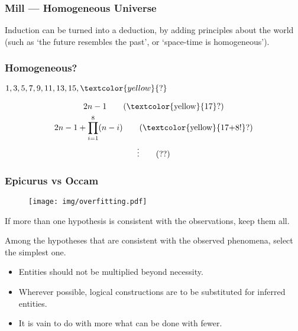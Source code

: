 \documentclass[UTF8,11pt,colorlinks,compress,openany]{beamer}%
\begin{document}
\begin{frame}\frametitle{Mill --- Homogeneous Universe}
	\begin{proposition}[Mill]
		Induction can be turned into a deduction, by adding principles about the world (such as `the future resembles the past', or `space-time is homogeneous').
	\end{proposition}
\end{frame}

\begin{frame}\frametitle{Homogeneous?}
	\begin{problem}
		$1,3,5,7,9,11,13,15,\textcolor{yellow}{\mathbf{?}}$
	\end{problem}
	\begin{solution}
		\begin{gather}
		2n-1\tag{\textcolor{yellow}{17}?}\\
		2n-1+\prod\limits_{i=1}^8(n-i)\tag{\textcolor{yellow}{17+8!}?}\\
		\vdots \tag{??}
		\end{gather}
	\end{solution}
\end{frame}

\begin{frame}\frametitle{Epicurus vs Occam}\vspace{-1ex}
	\begin{figure}[H]
		\begin{center}
			\texttt{[image: img/overfitting.pdf]}
		\end{center}
	\end{figure}\vspace{-2ex}
	\begin{proposition}[Epicurus]
		If more than one hypothesis is consistent with the observations, keep them all.
	\end{proposition}
	\begin{proposition}
		Among the hypotheses that are consistent with the observed phenomena, select the simplest one.
	\end{proposition}
	\begin{itemize}
		\item Entities should not be multiplied beyond necessity.
		\item Wherever possible, logical constructions are to be substituted for inferred entities.
		\item It is vain to do with more what can be done with fewer.
	\end{itemize}
\end{frame}
\end{document}
